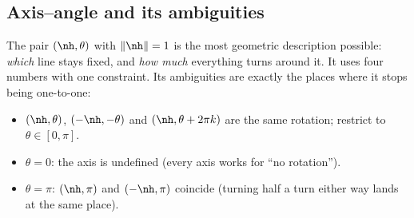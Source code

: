 \subsection{Axis--angle and its ambiguities}\label{sec:rot:axis-angle-ambiguities}
The pair $(\nh,\theta)$ with $\|\nh\|=1$ is the most geometric description possible: \emph{which} line stays fixed, and \emph{how much} everything turns around it. It uses four numbers with one constraint. Its ambiguities are exactly the places where it stops being one-to-one:
\begin{itemize}
\item $(\nh,\theta)$, $(-\nh,-\theta)$ and $(\nh,\theta+2\pi k)$ are the same rotation; restrict to $\theta\in[0,\pi]$.
\item $\theta=0$: the axis is undefined (every axis works for ``no rotation'').
\item $\theta=\pi$: $(\nh,\pi)$ and $(-\nh,\pi)$ coincide (turning half a turn either way lands at the same place).
\end{itemize}
